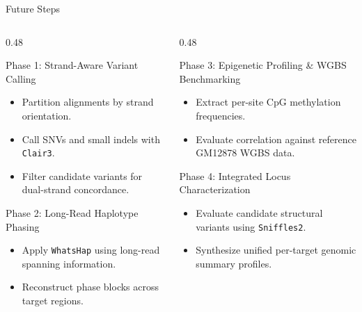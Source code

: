 \documentclass[aspectratio=169, 10pt]{beamer}
\begin{document}
\begin{frame}{Future Steps}
    \begin{columns}[T]
        \begin{column}{0.48\textwidth}
            \begin{block}{Phase 1: Strand-Aware Variant Calling}
                \begin{itemize}\footnotesize
                    \item Partition alignments by strand orientation.
                    \item Call SNVs and small indels with \texttt{Clair3}.
                    \item Filter candidate variants for dual-strand concordance.
                \end{itemize}
            \end{block}

            \begin{block}{Phase 2: Long-Read Haplotype Phasing}
                \begin{itemize}\footnotesize
                    \item Apply \texttt{WhatsHap} using long-read spanning information.
                    \item Reconstruct phase blocks across target regions.
                \end{itemize}
            \end{block}
        \end{column}

        \begin{column}{0.48\textwidth}
            \begin{block}{Phase 3: Epigenetic Profiling \& WGBS Benchmarking}
                \begin{itemize}\footnotesize
                    \item Extract per-site CpG methylation frequencies.
                    \item Evaluate correlation against reference GM12878 WGBS data.
                \end{itemize}
            \end{block}

            \begin{block}{Phase 4: Integrated Locus Characterization}
                \begin{itemize}\footnotesize
                    \item Evaluate candidate structural variants using \texttt{Sniffles2}.
                    \item Synthesize unified per-target genomic summary profiles.
                \end{itemize}
            \end{block}
        \end{column}
    \end{columns}
\end{frame}
\end{document}
